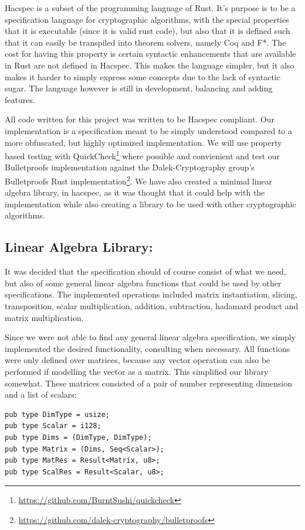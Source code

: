 \documentclass{article}
\begin{document}
Hacspec is a subset of the programming language of Rust. It's purpose is
to be a specification language for cryptographic algorithms, with the
special properties that it is executable (since it is valid rust code),
but also that it is defined such that it can easily be transpiled
into theorem solvers, namely Coq and F*. The cost for having this
property is certain syntactic enhancements that are available in Rust
are not defined in Hacspec. This makes the language simpler, but it
also makes it harder to simply express some concepts due to the lack
of syntactic sugar. The language however is still in development,
balancing and adding features.

All code written for this project was written to be Hacspec
compliant. Our implementation is a specification meant to be
simply understood compared to a more obfuscated, but highly
optimized implementation. We will use property based testing with
QuickCheck\footnote{\url{https://github.com/BurntSushi/quickcheck}}
where possible and convienient and test our Bulletproofs
implementation against the Dalek-Cryptography group's Bulletproofs Rust
implementation\footnote{\url{https://github.com/dalek-cryptography/bulletproofs}}.
We have also created a minimal linear algebra library,
in hacspec, as it was thought that it could help with the
implementation while also creating a library to be used with
other cryptographic algorithms.

\subsection{Linear Algebra Library:}
It was decided that the specification should of course consist of what
we need, but also of some general linear algebra functions that could
be used by other specifications. The implemented operations included
matrix instantiation, slicing, transposition, scalar multiplication,
addition, subtraction, hadamard product and matrix multiplication.

Since we were not able to find any general linear algebra
specification, we simply implemented the desired functionality,
consulting \cite{linear-algebra} when necessary. All functions were
only defined over matrices, because any vector operation can also
be performed if modelling the vector as a matrix. This simplified
our library somewhat. These matrices consisted of a pair of number
representing dimension and a list of scalars:

\begin{lstlisting}
pub type DimType = usize;
pub type Scalar = i128;
pub type Dims = (DimType, DimType);
pub type Matrix = (Dims, Seq<Scalar>);
pub type MatRes = Result<Matrix, u8>;
pub type ScalRes = Result<Scalar, u8>;
\end{lstlisting}
\end{document}
